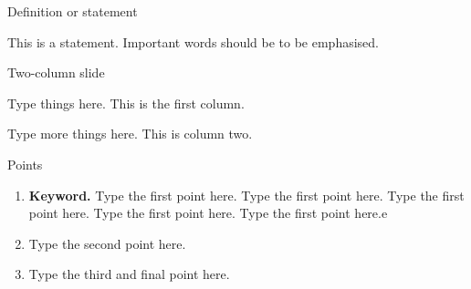 \documentclass[11pt]{article}
\begin{document}
	\begin{frame}{Definition or statement}
	
		{\centering %
		{\LARGE This is a statement. Important words should be  to be emphasised.}
		
		}
		
	\end{frame}

	\begin{frame}{Two-column slide}
		\begin{multicols}{2}
			Type things here. This is the first column.
			
				\columnbreak
				
			Type more things here. This is column two.
		\end{multicols}
	\end{frame}

	\begin{frame}{Points}
		\begin{enumerate}
			\item \textbf{Keyword.} Type the first point here. Type the first point here. Type the first point here. Type the first point here. Type the first point here.e
			\item Type the second point here.
			\item Type the third and final point here.
		\end{enumerate}
	\end{frame}
\end{document}
